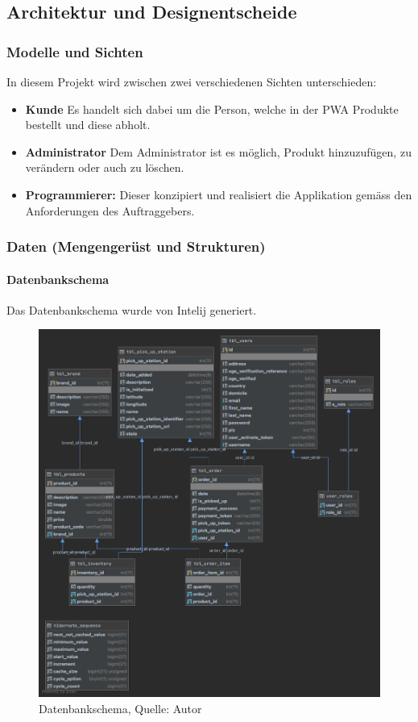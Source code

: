 \subsection{Architektur und Designentscheide}

\subsubsection{Modelle und Sichten}
In diesem Projekt wird zwischen zwei verschiedenen Sichten unterschieden:
\begin{itemize}
    \item \textbf{Kunde} Es handelt sich dabei um die Person, welche in der \ac{PWA} Produkte bestellt und diese abholt. 
    \item \textbf{Administrator} Dem Administrator ist es möglich, Produkt hinzuzufügen, zu verändern oder auch zu löschen. 
    \item \textbf{Programmierer: } Dieser konzipiert und realisiert die Applikation gemäss den Anforderungen des Auftraggebers.
\end{itemize}
\subsubsection{Daten (Mengengerüst und Strukturen)}
\paragraph{Datenbankschema}
Das Datenbankschema wurde von Intelij generiert. 
\begin{figure}[H]
    \centering
    \includegraphics[width=1\textwidth]{images/databaseSchema.png}
    \caption[Datenbankschema]{Datenbankschema, Quelle: Autor}
    \label{img: datebankschema}
\end{figure}

